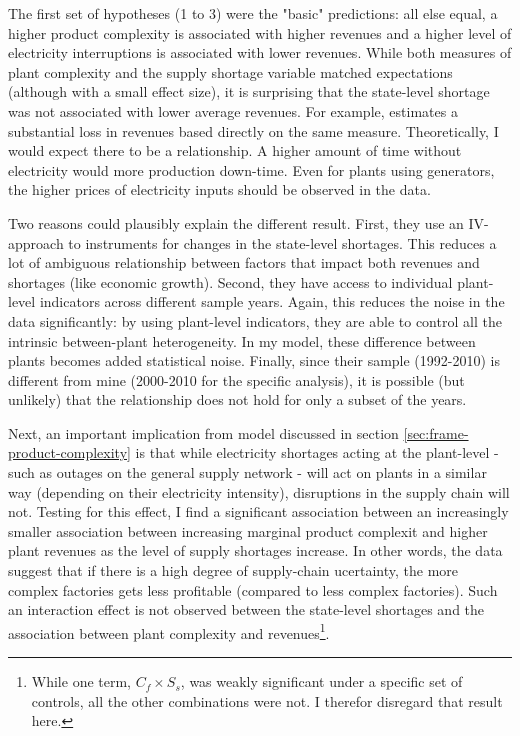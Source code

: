 \documentclass[11pt]{article}
\begin{document}
The first set of hypotheses (1 to 3) were the "basic" predictions: all else equal, a higher product complexity is associated with higher revenues and a higher level of electricity interruptions is associated with lower revenues. While both measures of plant complexity and the supply shortage variable matched expectations (although with a small effect size), it is surprising that the state-level shortage was not associated with lower average revenues. For example, \cite{allcott_how_2016} estimates a substantial loss in revenues based directly on the same measure. Theoretically, I would expect there to be a relationship. A higher amount of time without electricity would more production down-time. Even for plants using generators, the higher prices of electricity inputs should be observed in the data.

Two reasons could plausibly explain the different result. First, they use an IV-approach to instruments for changes in the state-level shortages. This reduces a lot of ambiguous relationship between factors that impact both revenues and shortages (like economic growth). Second, they have access to individual plant-level indicators across different sample years. Again, this reduces the noise in the data significantly: by using plant-level indicators, they are able to control all the intrinsic between-plant heterogeneity. In my model, these difference between plants becomes added statistical noise. Finally, since their sample (1992-2010) is different from mine (2000-2010 for the specific analysis), it is possible (but unlikely) that the relationship does not hold for only a subset of the years.

Next, an important implication from model discussed in section \ref{sec:frame-product-complexity} is that while electricity shortages acting at the plant-level - such as outages on the general supply network - will act on plants in a similar way (depending on their electricity intensity), disruptions in the supply chain will not. Testing for this effect, I find a significant association between an increasingly smaller association between increasing marginal product complexit and higher plant revenues as the level of supply shortages increase. In other words, the data suggest that if there is a high degree of supply-chain ucertainty, the more complex factories gets less profitable (compared to less complex factories). Such an interaction effect is not observed between the state-level shortages and the association between plant complexity and revenues\footnote{While one term, $C_f \times S_{s}$, was weakly significant under a specific set of controls, all the other combinations were not. I therefor disregard that result here.}.
\end{document}

